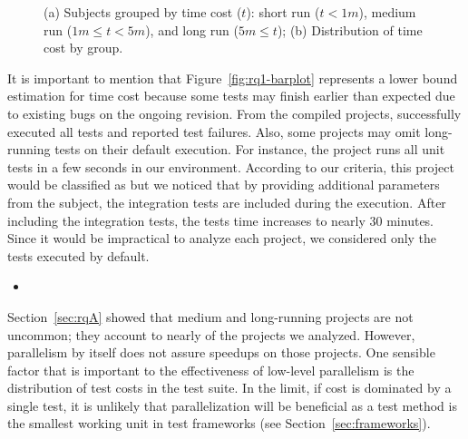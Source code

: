 \begin{figure}[ht]
\begin{subfigure}{0.24\textwidth}
        \caption{\label{fig:rq1-boxplot}}
    \end{subfigure}%
    \caption{(a) Subjects grouped by time cost ($t$): short run ($t <
    1m$), medium run ($1m \le t < 5m$), and long run ($5m \le t$); (b)
    Distribution of time cost by group.}
\end{figure}

It is important to mention that Figure~\ref{fig:rq1-barplot}
represents a lower bound estimation for time cost because some tests
may finish earlier than expected due to existing bugs on the ongoing
revision.  From the \numSubjs{} compiled projects, \numSubjsPass{}
successfully executed all tests and \numSubjsFail{} reported test
failures.  Also, some projects may omit long-running tests on their
default execution. For instance, the project
 runs all unit tests in a few seconds in
our environment.  According to our criteria, this project would be
classified as \shortg{} but we noticed that by providing additional
parameters from the subject, the integration tests are included during
the execution.  After including the integration tests, the tests time
increases to nearly 30 minutes.  Since it would be impractical to
analyze each project, we considered only the tests executed by
default.

\begin{center}
\end{center}


\vspace{1ex}
\begin{itemize}
    \item \textbf{\RQB}
\end{itemize}

Section~\ref{sec:rqA} showed that medium and long-running projects are
not uncommon; they account to nearly \percentMedLongRunning{} of the
\numSubjs{} projects we analyzed.  However, parallelism by itself does
not assure speedups on those projects.  One sensible factor that is
important to the effectiveness of low-level parallelism is the
distribution of test costs in the test suite.  In the limit, if cost
is dominated by a single test, it is unlikely that parallelization
will be beneficial as a test method is the smallest working unit in
test frameworks (see Section~\ref{sec:frameworks}).

